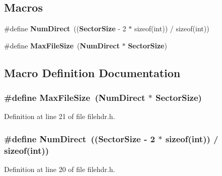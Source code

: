 \subsection*{Macros}
\begin{DoxyCompactItemize}
\item 
\#define {\bf Num\+Direct}~(({\bf Sector\+Size} -\/ 2 $\ast$ sizeof(int)) / sizeof(int))
\item 
\#define {\bf Max\+File\+Size}~({\bf Num\+Direct} $\ast$ {\bf Sector\+Size})
\end{DoxyCompactItemize}


\subsection{Macro Definition Documentation}
\subsubsection[{Max\+File\+Size}]{\setlength{\rightskip}{0pt plus 5cm}\#define Max\+File\+Size~({\bf Num\+Direct} $\ast$ {\bf Sector\+Size})}\label{filehdr_8h_a69b573417babb57474d05562283742b6}


Definition at line 21 of file filehdr.\+h.

\subsubsection[{Num\+Direct}]{\setlength{\rightskip}{0pt plus 5cm}\#define Num\+Direct~(({\bf Sector\+Size} -\/ 2 $\ast$ sizeof(int)) / sizeof(int))}\label{filehdr_8h_a193693ecec4f818d8270c659139e3961}


Definition at line 20 of file filehdr.\+h.

